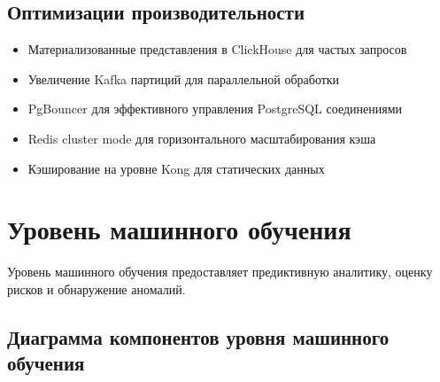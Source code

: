 \documentclass[a4paper,11pt]{article}
\begin{document}
\subsection{Оптимизации производительности}

\begin{itemize}
    \item Материализованные представления в ClickHouse для частых запросов
    \item Увеличение Kafka партиций для параллельной обработки
    \item PgBouncer для эффективного управления PostgreSQL соединениями
    \item Redis cluster mode для горизонтального масштабирования кэша
    \item Кэширование на уровне Kong для статических данных
\end{itemize}

\newpage

\section{Уровень машинного обучения}

Уровень машинного обучения предоставляет предиктивную аналитику, оценку рисков и обнаружение аномалий.

\subsection{Диаграмма компонентов уровня машинного обучения}
\end{document}
